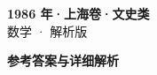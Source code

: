 \documentclass[zihao=-4, a4paper]{ctexart}
\begin{document}
\begin{center}
  {\Large\bfseries 1986 年·上海卷·文史类}\\[4pt]
  {\large 数学 · 解析版}
\end{center}
\medskip
{}

\clearpage
{}
\begin{center}{\Large\bfseries 参考答案与详细解析}\end{center}
\medskip

\end{document}
